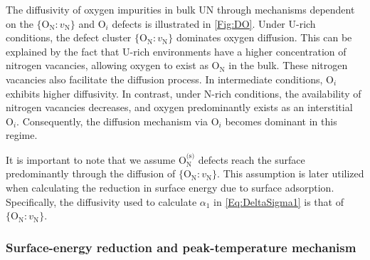 \documentclass[preprint,12pt,sort&compress]{elsarticle}
\newcommand{\?}{\stackrel{?}{=}}
\begin{document}
The diffusivity of oxygen impurities in bulk UN through mechanisms dependent on the $\{\text{O}_\text{N} \! : \! v_\text{N}\}$ and $\text{O}_i$ defects is illustrated in \cref{Fig:DO}. Under U-rich conditions, the defect cluster $ \{\text{O}_\text{N} \! : \! v_\text{N}\} $ dominates oxygen diffusion. This can be explained by the fact that U-rich environments have a higher concentration of nitrogen vacancies, allowing oxygen to exist as $ \text{O}_\text{N} $ in the bulk. These nitrogen vacancies also facilitate the diffusion process. In intermediate conditions, $\text{O}_i$ exhibits higher diffusivity. In contrast, under N-rich conditions, the availability of nitrogen vacancies decreases, and oxygen predominantly exists as an interstitial $\text{O}_i$. Consequently, the diffusion mechanism via $ \text{O}_i $ becomes dominant in this regime.

It is important to note that we assume $\text{O}_\text{N}^\text{(s)}$ defects reach the surface predominantly through the diffusion of $\{\text{O}_\text{N} \! : \! v_\text{N}\}$. This assumption is later utilized when calculating the reduction in surface energy due to surface adsorption. Specifically, the diffusivity used to calculate $\alpha_1$ in \cref{Eq:DeltaSigma1} is that of $\{\text{O}_\text{N} \! : \! v_\text{N}\}$.

\subsubsection{Surface-energy reduction and peak-temperature mechanism}
\end{document}
